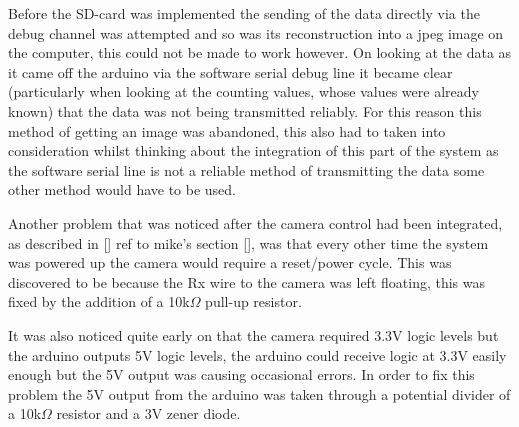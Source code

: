 Before the SD-card was implemented the sending of the data directly via the debug channel was attempted and so was its reconstruction into a jpeg image on the computer, this could not be made to work however. On looking at the data as it came off the arduino via the software serial debug line it became clear (particularly when looking at the counting values, whose values were already known) that the data was not being transmitted reliably. For this reason this method of getting an image was abandoned, this also had to taken into consideration whilst thinking about the integration of this part of the system as the software serial line is not a reliable method of transmitting the data some other method would have to be used.

Another problem that was noticed after the camera control had been integrated, as described in [] ref to mike's section [], was that every other time the system was powered up the camera would require a reset/power cycle. This was discovered to be because the Rx wire to the camera was left floating, this was fixed by the addition of a 10k$\Omega$ pull-up resistor.

It was also noticed quite early on that the camera required 3.3V logic levels but the arduino outputs 5V logic levels, the arduino could receive logic at 3.3V easily enough but the 5V output was causing occasional errors. In order to fix this problem the 5V output from the arduino was taken through a potential divider of a 10k$\Omega$ resistor and a 3V zener diode.